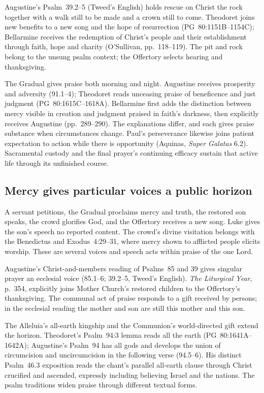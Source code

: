 Augustine's Psalm~39.2--5 (Tweed's English) holds rescue on Christ the
rock together with a walk still to be made and a crown still to come.
Theodoret joins new benefits to a new song and the hope of resurrection
(PG~80:1151B--1154C); Bellarmine receives the redemption of Christ's
people and their establishment through faith, hope and charity
(O'Sullivan, pp.~118--119). The pit and rock belong to the unsung psalm
context; the Offertory selects hearing and thanksgiving.

The Gradual gives praise both morning and night. Augustine receives
prosperity and adversity (91.1--4); Theodoret reads unceasing praise of
beneficence and just judgment (PG~80:1615C--1618A). Bellarmine first
adds the distinction between mercy visible in creation and judgment praised
in faith's darkness, then explicitly receives Augustine (pp.~289--290).
The explanations differ, and each gives praise substance when circumstances
change. Paul's perseverance likewise joins patient expectation to action
while there is opportunity (Aquinas, \emph{Super Galatas} 6.2).
Sacramental custody and the final prayer's continuing efficacy sustain
that active life through its unfinished course.

\subsection*{Mercy gives particular voices a public horizon\enspace{}}

A servant petitions, the Gradual proclaims mercy and truth, the restored
son speaks, the crowd glorifies God, and the Offertory receives a new song.
Luke gives the son's speech no reported content. The crowd's divine
visitation belongs with the Benedictus and Exodus~4:29--31, where mercy
shown to afflicted people elicits worship. These are several voices and
speech acts within praise of the one Lord.

Augustine's Christ-and-members reading of Psalms~85 and 39 gives singular
prayer an ecclesial voice (85.1--6; 39.2--5, Tweed's English).
\emph{The Liturgical Year}, p.~354, explicitly joins Mother Church's
restored children to the Offertory's thanksgiving. The communal act of
praise responds to a gift received by persons; in the ecclesial reading the
mother and son are still this mother and this son.

The Alleluia's all-earth kingship and the Communion's world-directed gift
extend the horizon. Theodoret's Psalm~94:3 lemma reads all the earth
(PG~80:1641A--1642A); Augustine's Psalm~94 has all gods and develops
the union of circumcision and uncircumcision in the following verse
(94.5--6). His distinct Psalm~46.3 exposition reads the chant's parallel
all-earth clause through Christ crucified and ascended, expressly
including believing Israel and the nations. The psalm traditions widen
praise through different textual forms.

